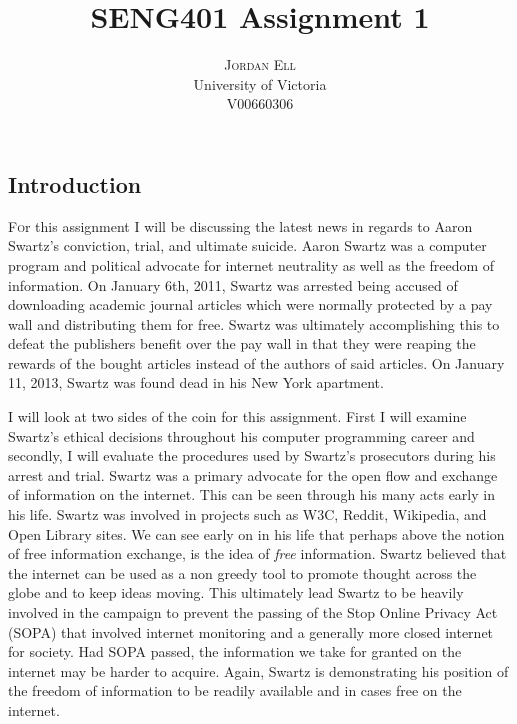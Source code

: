 \documentclass[twoside]{article}
\title{\vspace{-15mm}\fontsize{24pt}{10pt}\selectfont\textbf{SENG401 Assignment 1}} %
\author{
\large
\textsc{Jordan Ell}\\[2mm] %
\normalsize University of Victoria \\ V00660306 %
\vspace{-5mm}
}
\date{}
\begin{document}
\maketitle %

\thispagestyle{fancy} %


\begin{multicols}{2} %

\section{Introduction}

\lettrine[nindent=0em,lines=3]{F} or this assignment I will be discussing the latest news
in regards to Aaron Swartz's conviction, trial, and ultimate suicide. Aaron Swartz was a computer program and political advocate for internet neutrality as well as the freedom of information. On January 6th, 2011, Swartz was arrested being accused of downloading academic journal articles which were normally protected by a pay wall and distributing them for free. Swartz was ultimately accomplishing this to defeat the publishers benefit over the pay wall in that they were reaping the rewards of the bought articles instead of the authors of said articles. On January 11, 2013, Swartz was found dead in his New York apartment. 

I will look at two sides of the coin for this assignment. First I will examine Swartz's ethical decisions throughout his computer programming career and secondly, I will evaluate the procedures used by Swartz's prosecutors during his arrest and trial. Swartz was a primary advocate for the open flow and exchange of information on the internet. This can be seen through his many acts early in his life. Swartz was involved in projects such as W3C, Reddit, Wikipedia, and Open Library sites. We can see early on in his life that perhaps above the notion of free information exchange, is the idea of \textit{free} information. Swartz believed that the internet can be used as a non greedy tool to promote thought across the globe and to keep ideas moving. This ultimately lead Swartz to be heavily involved in the campaign to prevent the passing of the Stop Online Privacy Act (SOPA) that involved internet monitoring and a generally more closed internet for society. Had SOPA passed, the information we take for granted on the internet may be harder to acquire. Again, Swartz is demonstrating his position of the freedom of information to be readily available and in cases free on the internet. 


\end{multicols}
\end{document}
